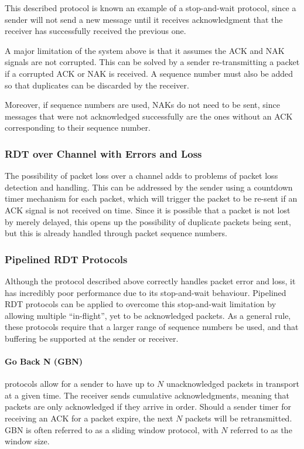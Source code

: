 \documentclass[12pt,titlepage]{article}
\begin{document}
        This described protocol is known an example of a stop-and-wait protocol, since a sender will not send a new message until it receives acknowledgment that the receiver has
        successfully received the previous one.

        A major limitation of the system above is that it assumes the ACK and NAK signals are not corrupted. This can be solved by a sender re-transmitting a packet if a corrupted ACK or
        NAK is received. A sequence number must also be added so that duplicates can be discarded by the receiver.

        Moreover, if sequence numbers are used, NAKs do not need to be sent, since messages that were not acknowledged successfully are the ones without an ACK corresponding to their
        sequence number.

      \subsubsection{RDT over Channel with Errors and Loss}
        The possibility of packet loss over a channel adds to problems of packet loss detection and handling. This can be addressed by the sender using a countdown timer mechanism for each
        packet, which will trigger the packet to be re-sent if an ACK signal is not received on time. Since it is possible that a packet is not lost by merely delayed, this opens up the
        possibility of duplicate packets being sent, but this is already handled through packet sequence numbers.

      \subsubsection{Pipelined RDT Protocols}
        Although the protocol described above correctly handles packet error and loss, it has incredibly poor performance due to its stop-and-wait behaviour. Pipelined RDT protocols can
        be applied to overcome this stop-and-wait limitation by allowing multiple ``in-flight'', yet to be acknowledged packets. As a general rule, these protocols require that a larger
        range of sequence numbers be used, and that buffering be supported at the sender or receiver.

        \paragraph{Go Back N (GBN)} protocols allow for a sender to have up to $N$ unacknowledged packets in transport at a given time. The receiver sends cumulative acknowledgments,
        meaning that packets are only acknowledged if they arrive in order. Should a sender timer for receiving an ACK for a packet expire, the next $N$ packets will be retransmitted.
        GBN is often referred to as a sliding window protocol, with $N$ referred to as the window size.
\end{document}
